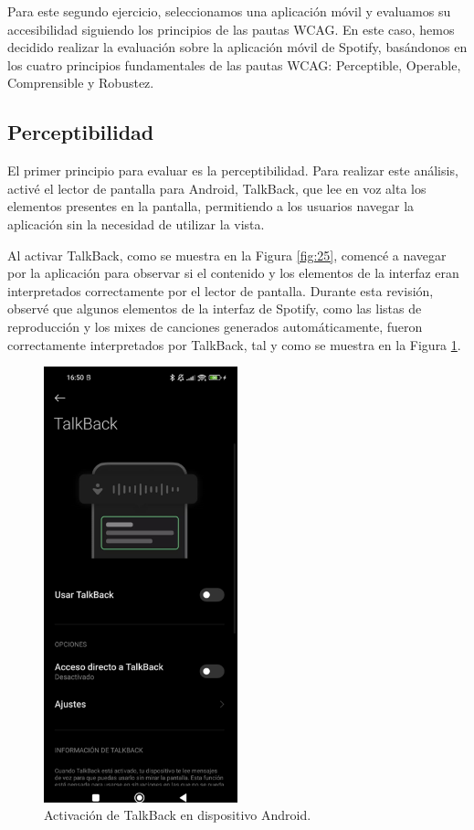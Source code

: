 \documentclass[letterpaper, 12pt]{report}
\begin{document}
Para este segundo ejercicio, seleccionamos una aplicación móvil y evaluamos su accesibilidad siguiendo los principios de las pautas WCAG. En este caso, hemos decidido realizar la evaluación sobre la aplicación móvil de Spotify, basándonos en los cuatro principios fundamentales de las pautas WCAG: Perceptible, Operable, Comprensible y Robustez.

\subsection{Perceptibilidad}

El primer principio para evaluar es la perceptibilidad. Para realizar este análisis, activé el lector de pantalla para Android, TalkBack, que lee en voz alta los elementos presentes en la pantalla, permitiendo a los usuarios navegar la aplicación sin la necesidad de utilizar la vista.

Al activar TalkBack, como se muestra en la Figura \ref{fig:25}, comencé a navegar por la aplicación para observar si el contenido y los elementos de la interfaz eran interpretados correctamente por el lector de pantalla. Durante esta revisión, observé que algunos elementos de la interfaz de Spotify, como las listas de reproducción y los mixes de canciones generados automáticamente, fueron correctamente interpretados por TalkBack, tal y como se muestra en la Figura \ref{fig:26}.

\begin{figure}[H]
\centering
\includegraphics[width=0.5\textwidth]{figure26.png}
\caption{Activación de TalkBack en dispositivo Android.}
\label{fig:26}
\end{figure}
\end{document}
